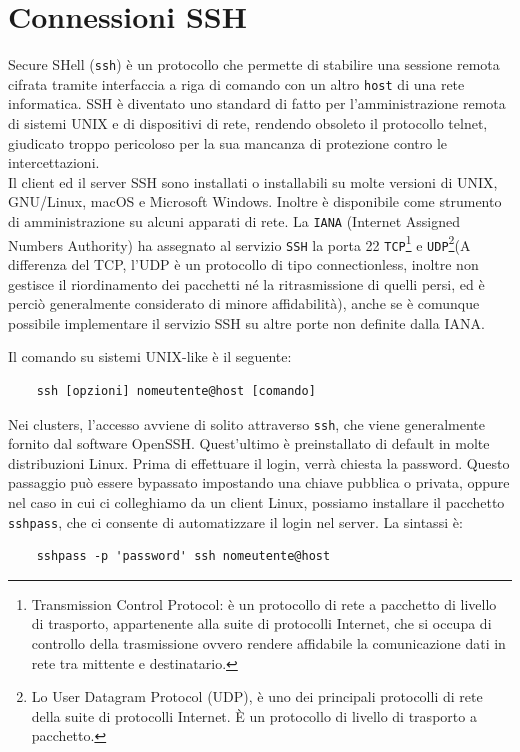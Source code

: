 \chapter{Connessioni SSH}
Secure SHell (\verb*|ssh|) è un protocollo che permette di stabilire una sessione remota cifrata tramite interfaccia a riga di comando con un altro \verb*|host| di una rete informatica. SSH è diventato uno standard di fatto per l'amministrazione remota di sistemi UNIX e di dispositivi di rete, rendendo obsoleto il protocollo telnet, giudicato troppo pericoloso per la sua mancanza di protezione contro le intercettazioni.\\
Il client ed il server SSH sono installati o installabili su molte versioni di UNIX, GNU/Linux, macOS e Microsoft Windows. Inoltre è disponibile come strumento di amministrazione su alcuni apparati di rete. La \verb*|IANA| (Internet Assigned Numbers Authority) ha assegnato al servizio \verb*|SSH| la porta 22 \verb*|TCP|\footnote{Transmission Control Protocol: è un protocollo di rete a pacchetto di livello di trasporto, appartenente alla suite di protocolli Internet, che si occupa di controllo della trasmissione ovvero rendere affidabile la comunicazione dati in rete tra mittente e destinatario.} e \verb*|UDP|\footnote{Lo User Datagram Protocol (UDP), è uno dei principali protocolli di rete della suite di protocolli Internet. È un protocollo di livello di trasporto a pacchetto.}(A differenza del TCP, l'UDP è un protocollo di tipo connectionless, inoltre non gestisce il riordinamento dei pacchetti né la ritrasmissione di quelli persi, ed è perciò generalmente considerato di minore affidabilità), anche se è comunque possibile implementare il servizio SSH su altre porte non definite dalla IANA.

Il comando su sistemi UNIX-like è il seguente: 
\begin{verbatim}
	ssh [opzioni] nomeutente@host [comando]
\end{verbatim}

Nei clusters, l'accesso avviene di solito attraverso \verb*|ssh|, che viene generalmente fornito dal software OpenSSH. Quest'ultimo è preinstallato di default in molte distribuzioni Linux. Prima di effettuare il login, verrà chiesta la password. Questo passaggio può essere bypassato impostando una chiave pubblica o privata, oppure nel caso in cui ci colleghiamo da un client Linux, possiamo installare il pacchetto \verb*|sshpass|, che ci consente di automatizzare il login nel server. La sintassi è:
\begin{verbatim}
	sshpass -p 'password' ssh nomeutente@host
\end{verbatim}

